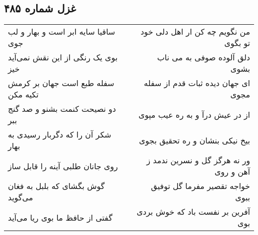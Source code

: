 \begin{center}
\section*{غزل شماره ۴۸۵}
\label{sec:sh485}
\begin{longtable}{l p{0.5cm} r}
ساقیا سایه ابر است و بهار و لب جوی
&&
من نگویم چه کن ار اهل دلی خود تو بگوی
\\
بوی یک رنگی از این نقش نمی‌آید خیز
&&
دلق آلوده صوفی به می ناب بشوی
\\
سفله طبع است جهان بر کرمش تکیه مکن
&&
ای جهان دیده ثبات قدم از سفله مجوی
\\
دو نصیحت کنمت بشنو و صد گنج ببر
&&
از در عیش درآ و به ره عیب مپوی
\\
شکر آن را که دگربار رسیدی به بهار
&&
بیخ نیکی بنشان و ره تحقیق بجوی
\\
روی جانان طلبی آینه را قابل ساز
&&
ور نه هرگز گل و نسرین ندمد ز آهن و روی
\\
گوش بگشای که بلبل به فغان می‌گوید
&&
خواجه تقصیر مفرما گل توفیق ببوی
\\
گفتی از حافظ ما بوی ریا می‌آید
&&
آفرین بر نفست باد که خوش بردی بوی
\\
\end{longtable}
\end{center}
